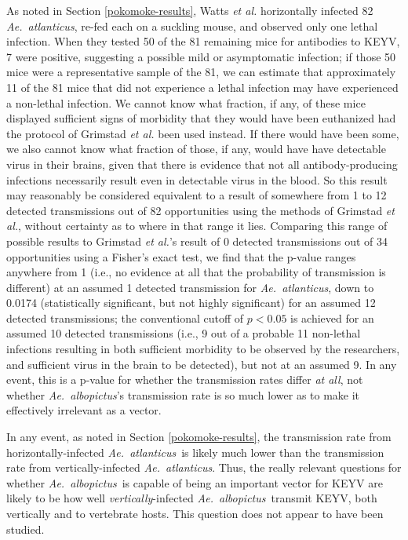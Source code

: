 \documentclass[12pt]{article}
\newcommand{\alb}{\textit{Ae.\ albopictus}}
\newcommand{\atl}{\textit{Ae.\ atlanticus}}
\newcommand{\cjh}{\textcolor{blue}{cjh}}
\newcommand{\msg}[3]{(#1 $\rightarrow$ #2: #3)}
\newcommand{\mcc}[1]{\msg\cjh\cjh{#1}}
\begin{document}
        As noted in Section \ref{pokomoke-results}, Watts \textit{et al.} horizontally infected 82 \atl, re-fed each on a suckling mouse, and observed only one lethal infection. When they tested 50 of the 81 remaining mice for antibodies to KEYV, 7 were positive, suggesting a possible mild or asymptomatic infection; if those 50 mice were a representative sample of the 81, we can estimate that approximately 11 of the 81 mice that did not experience a lethal infection may have experienced a non-lethal infection. We cannot know what fraction, if any, of these mice displayed sufficient signs of morbidity that they would have been euthanized had the protocol of Grimstad \textit{et al.} been used instead. If there would have been some, we also cannot know what fraction of those, if any, would have have detectable virus in their brains, given that there is evidence that not all antibody-producing infections necessarily result even in detectable virus in the blood\cite{watts1988maintenance}. So this result may reasonably be considered equivalent to a result of somewhere from 1 to 12 detected transmissions out of 82 opportunities using the methods of Grimstad \textit{et al.}, without certainty as to where in that range it lies. Comparing this range of possible results to Grimstad \textit{et al.}'s result of 0 detected transmissions out of 34 opportunities using a Fisher's exact test, we find that the p-value ranges anywhere from 1 (i.e., no evidence at all that the probability of transmission is different) at an assumed 1 detected transmission for \atl, down to 0.0174 (statistically significant, but not highly significant) for an assumed 12 detected transmissions; the conventional cutoff of $p < 0.05$ is achieved for an assumed 10 detected transmissions (i.e., 9 out of a probable 11 non-lethal infections resulting in both sufficient morbidity to be observed by the researchers, and sufficient virus in the brain to be detected), but not at an assumed 9. In any event, this is a p-value for whether the transmission rates differ \textit{at all}, not whether \textit{Ae.~albopictus}'s transmission rate is so much lower as to make it effectively irrelevant as a vector.

        In any event, as noted in Section \ref{pokomoke-results}, the transmission rate from horizontally-infected \atl\ is likely much lower than the transmission rate from vertically-infected \atl. Thus, the really relevant questions for whether \alb\ is capable of being an important vector for KEYV are likely to be how well \textit{vertically}-infected \alb\ transmit KEYV, both vertically and to vertebrate hosts. This question does not appear to have been studied.
\end{document}
